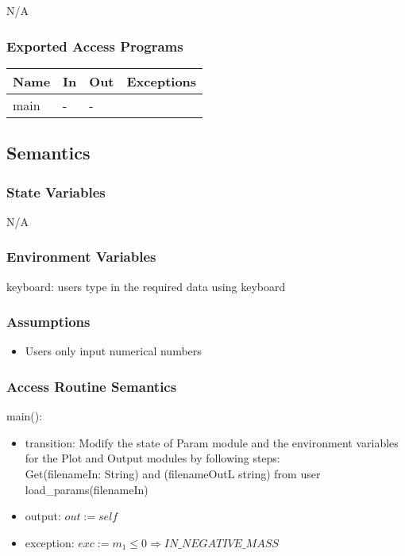 \documentclass[12pt, titlepage]{article}
\begin{document}
N/A
\subsubsection{Exported Access Programs}

\begin{center}
\begin{tabular}{p{4cm} p{2cm} p{2cm} p{6cm}}
\hline
\textbf{Name} & \textbf{In} & \textbf{Out} & \textbf{Exceptions} \\
\hline
main & - & - &  \\
\end{tabular}
\end{center}

\subsection{Semantics}

\subsubsection{State Variables}
N/A

\subsubsection{Environment Variables}
keyboard: users type in the required data using keyboard
\subsubsection{Assumptions}
\begin{itemize}
  \item Users only input numerical numbers
\end{itemize}

\subsubsection{Access Routine Semantics}

\noindent main():
\begin{itemize}
\item transition: Modify the state of Param module and the environment variables for the Plot and Output modules by following steps: \\
Get(filenameIn: String) and (filenameOutL string) from user\\
load_params(filenameIn)\\
\item output: $out := self$
\item exception: $exc := m_1 \leq 0 \Rightarrow IN\_NEGATIVE\_MASS$
\end{itemize}
\end{document}
